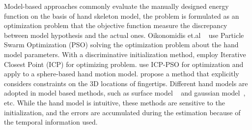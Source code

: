 \documentclass[journal,comsoc]{IEEEtran}
\begin{document}
Model-based approaches commonly evaluate the manually designed energy function on the basis of hand skeleton model,
the problem is formulated as an optimization problem that the objective function measure the discrepancy between
model hypothesis and the actual ones. Oikonomidis et.al ~\cite{oikonomidis2010markerless,oikonomidis2011efficient}
use Particle Swarm Optimization (PSO) solving the optimization problem about the hand model parameters.
With a discriminative initialization method, \cite{tagliasacchi2015robust} employ Iterative Closest Point (ICP)
for optimizing problem. \cite{qian2014realtime} use ICP-PSO for optimization and apply to a sphere-based hand motion model.
\cite{RoditakisMakrisArgyros2017} propose a method that explicitly considers constraints on the 3D locations of fingertips.
Different hand models are adopted in model based methods, such as surface model
~\cite{qian2014realtime,khamis2015learning} and gaussian model~\cite{sridhar2014real,tang2015opening},
etc. While the hand model is intuitive, these methods are sensitive to the initialization, and the errors are accumulated
during the estimation because of the temporal information used.
\end{document}
